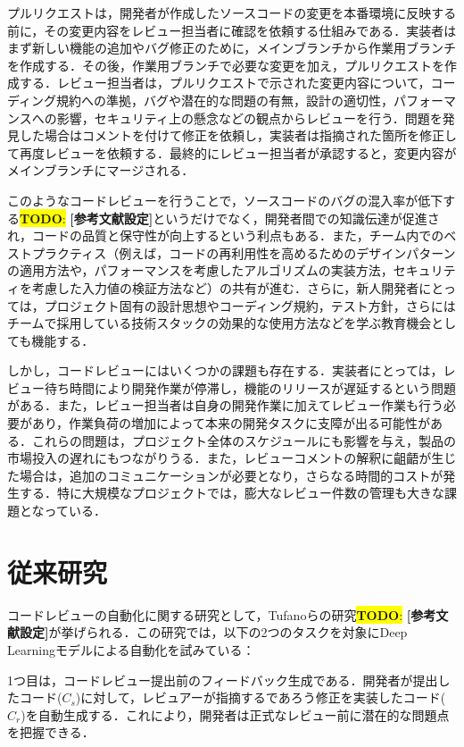 \documentclass[11pt]{jreport}
\newcommand{\todo}[1]{\colorbox{yellow}{{\bf TODO}:}{\color{red} {\textbf{[#1]}}}}
\begin{document}
プルリクエストは，開発者が作成したソースコードの変更を本番環境に反映する前に，その変更内容をレビュー担当者に確認を依頼する仕組みである．実装者はまず新しい機能の追加やバグ修正のために，メインブランチから作業用ブランチを作成する．その後，作業用ブランチで必要な変更を加え，プルリクエストを作成する．レビュー担当者は，プルリクエストで示された変更内容について，コーディング規約への準拠，バグや潜在的な問題の有無，設計の適切性，パフォーマンスへの影響，セキュリティ上の懸念などの観点からレビューを行う．問題を発見した場合はコメントを付けて修正を依頼し，実装者は指摘された箇所を修正して再度レビューを依頼する．最終的にレビュー担当者が承認すると，変更内容がメインブランチにマージされる．

このようなコードレビューを行うことで，ソースコードのバグの混入率が低下する\todo{参考文献設定}というだけでなく，開発者間での知識伝達が促進され，コードの品質と保守性が向上するという利点もある．また，チーム内でのベストプラクティス（例えば，コードの再利用性を高めるためのデザインパターンの適用方法や，パフォーマンスを考慮したアルゴリズムの実装方法，セキュリティを考慮した入力値の検証方法など）の共有が進む．さらに，新人開発者にとっては，プロジェクト固有の設計思想やコーディング規約，テスト方針，さらにはチームで採用している技術スタックの効果的な使用方法などを学ぶ教育機会としても機能する．

しかし，コードレビューにはいくつかの課題も存在する．実装者にとっては，レビュー待ち時間により開発作業が停滞し，機能のリリースが遅延するという問題がある．また，レビュー担当者は自身の開発作業に加えてレビュー作業も行う必要があり，作業負荷の増加によって本来の開発タスクに支障が出る可能性がある．これらの問題は，プロジェクト全体のスケジュールにも影響を与え，製品の市場投入の遅れにもつながりうる．また，レビューコメントの解釈に齟齬が生じた場合は，追加のコミュニケーションが必要となり，さらなる時間的コストが発生する．特に大規模なプロジェクトでは，膨大なレビュー件数の管理も大きな課題となっている．

\section{従来研究}
コードレビューの自動化に関する研究として，Tufanoらの研究\todo{参考文献設定}が挙げられる．この研究では，以下の2つのタスクを対象にDeep Learningモデルによる自動化を試みている：

1つ目は，コードレビュー提出前のフィードバック生成である．開発者が提出したコード($C_s$)に対して，レビュアーが指摘するであろう修正を実装したコード($C_r$)を自動生成する．これにより，開発者は正式なレビュー前に潜在的な問題点を把握できる．
\end{document}
